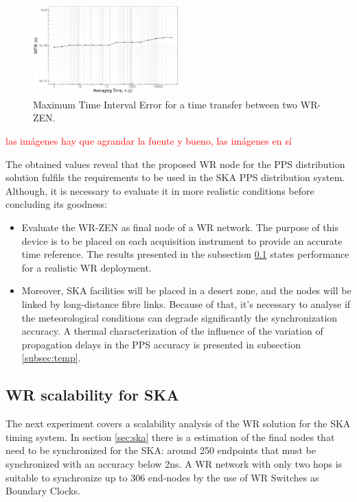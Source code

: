 \begin{figure}
		\centering
		\includegraphics[width=0.5\textwidth]{img/MTIE_exp1}
		\caption[MTIE plot for the WR-ZEN]{Maximum Time Interval Error for a 
		time transfer between two WR-ZEN.}
		\label{fig:mtie_exp1}

\end{figure}

\textcolor{red}{las imágenes hay que agrandar la fuente y bueno, las imágenes en sí}

The obtained values reveal that the proposed WR node for the PPS distribution 
solution fulfils the requirements to be used in the SKA PPS distribution 
system. Although, it is necessary to evaluate it in more realistic conditions 
before concluding its goodness:

\begin{itemize}
	\item Evaluate the WR-ZEN as final node of a WR network. The purpose of 
	this device is to be placed on each acquisition instrument to provide an 
	accurate time reference. The results presented in the subsection 
	\ref{subsec: net_exp} states performance for a realistic WR deployment.
	
	\item Moreover, SKA facilities will be placed in a desert zone, and 
	the nodes will be linked by long-distance fibre links. Because of that, 
	it's 
	necessary to analyse if the meteorological conditions can degrade 
	significantly the synchronization accuracy. A thermal characterization of 
	the influence of the variation of propagation delays in the PPS accuracy is 
	presented in subsection \ref{subsec:temp}.
\end{itemize}   

\subsection{WR scalability for SKA} %
\label{subsec: net_exp}

The next experiment covers a scalability analysis of the WR solution for the 
SKA timing system. In section \ref{sec:ska} there is a estimation of the final 
nodes that need to be synchronized for the SKA: around 250 endpoints that 
must be synchronized with an accuracy below 2ns. A WR network with only two 
hops is suitable to synchronize up to 306 end-nodes by the use of WR Switches as 
Boundary Clocks.

